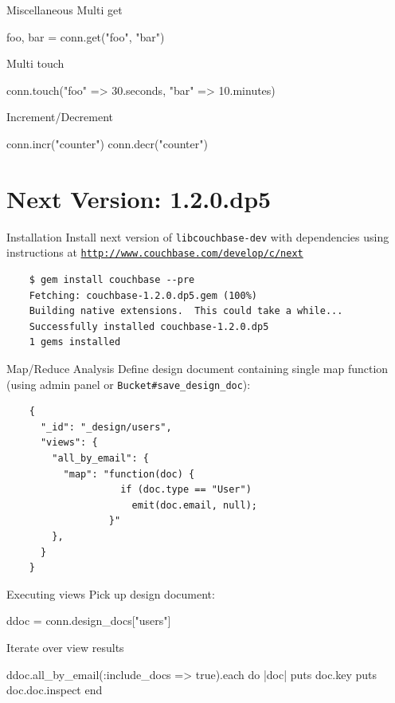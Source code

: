 \documentclass[aspectratio=43,handout]{beamer}
\begin{document}
\begin{frame}[fragile]{Miscellaneous}
  Multi get
  \begin{semiverbatim}
    foo, bar = conn.get("foo", "bar")
  \end{semiverbatim}

  Multi touch
  \begin{semiverbatim}
    conn.touch("foo" => 30.seconds, "bar" => 10.minutes)
  \end{semiverbatim}

  Increment/Decrement
  \begin{semiverbatim}
    conn.incr("counter")
    conn.decr("counter")
  \end{semiverbatim}
\end{frame}

\section{Next Version: 1.2.0.dp5}

\begin{frame}[fragile]{Installation}
  Install next version of \texttt{libcouchbase-dev} with dependencies using instructions at
  \href{http://www.couchbase.com/develop/c/next}{\tt{}http://www.couchbase.com/develop/c/\alert{next}}

  \begin{verbatim}
    $ gem install couchbase --pre
    Fetching: couchbase-1.2.0.dp5.gem (100%)
    Building native extensions.  This could take a while...
    Successfully installed couchbase-1.2.0.dp5
    1 gems installed
  \end{verbatim}
\end{frame}

\begin{frame}[fragile]{Map/Reduce Analysis}
  Define \alert{design document} containing single \alert{map} function
  (using admin panel or \texttt{Bucket\#save\_design\_doc}):

  \begin{verbatim}
    {
      "_id": "_design/users",
      "views": {
        "all_by_email": {
          "map": "function(doc) {
                    if (doc.type == "User")
                      emit(doc.email, null);
                  }"
        },
      }
    }
  \end{verbatim}
\end{frame}

\begin{frame}[fragile]{Executing views}
  Pick up design document:

  \begin{semiverbatim}
    ddoc = conn.design_docs["users"]
  \end{semiverbatim}

  Iterate over view results

  \begin{semiverbatim}
    ddoc.all_by_email(:include_docs => true).each do |doc|
      puts doc.key
      puts doc.doc.inspect
    end
  \end{semiverbatim}
\end{frame}
\end{document}
